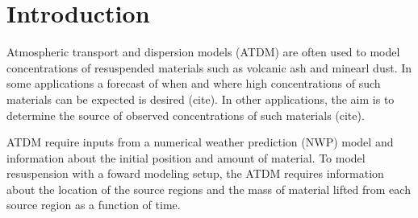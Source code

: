 \documentclass[draft]{agujournal2018}
\begin{document}

%
%
%
%




\section{Introduction}  %
Atmospheric transport and dispersion models (ATDM) are often used to model concentrations
of resuspended materials such as volcanic ash and minearl dust. In some applications a forecast of when and where
high concentrations of such materials can be expected is desired (cite). In other applications, the aim
is to determine the source of observed concentrations of such materials (cite).

ATDM require inputs from a numerical weather prediction (NWP) model and
information about the initial position and amount of material. To model resuspension with a foward modeling setup, the ATDM
requires information about the location of the source regions and the mass of material lifted from each source
region as a function of time. 
\end{document}

